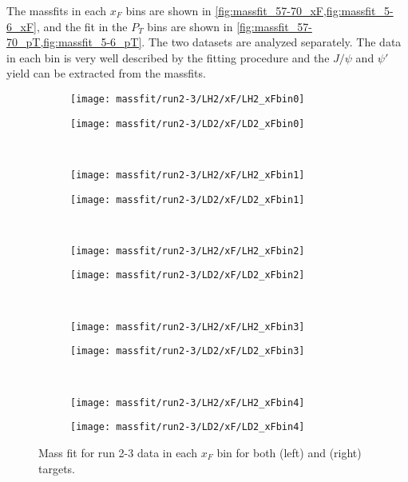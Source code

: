 \documentclass[../main.tex]{subfiles}
\begin{document}
The massfits in each $x_F$ bins are shown in \cref{fig:massfit_57-70_xF,fig:massfit_5-6_xF},
and the fit in the $P_T$ bins are shown in \cref{fig:massfit_57-70_pT,fig:massfit_5-6_pT}.
The two datasets are analyzed separately. The data in each bin is very well described by the fitting procedure
and the $J/\psi$ and $\psi'$ yield can be extracted from the massfits.
\begin{figure}[h]
	\centering
	\begin{subfigure}{0.4\linewidth}
		\texttt{[image: massfit/run2-3/LH2/xF/LH2\_xFbin0]}
	\end{subfigure}
	\begin{subfigure}{0.4\linewidth}
		\texttt{[image: massfit/run2-3/LD2/xF/LD2\_xFbin0]}
	\end{subfigure}\\
	\begin{subfigure}{0.4\linewidth}
		\texttt{[image: massfit/run2-3/LH2/xF/LH2\_xFbin1]}
	\end{subfigure}
	\begin{subfigure}{0.4\linewidth}
		\texttt{[image: massfit/run2-3/LD2/xF/LD2\_xFbin1]}
	\end{subfigure}\\
	\begin{subfigure}{0.4\linewidth}
		\texttt{[image: massfit/run2-3/LH2/xF/LH2\_xFbin2]}
	\end{subfigure}
	\begin{subfigure}{0.4\linewidth}
		\texttt{[image: massfit/run2-3/LD2/xF/LD2\_xFbin2]}
	\end{subfigure}\\
	\begin{subfigure}{0.4\linewidth}
		\texttt{[image: massfit/run2-3/LH2/xF/LH2\_xFbin3]}
	\end{subfigure}
	\begin{subfigure}{0.4\linewidth}
		\texttt{[image: massfit/run2-3/LD2/xF/LD2\_xFbin3]}
	\end{subfigure}\\
	\begin{subfigure}{0.4\linewidth}
		\texttt{[image: massfit/run2-3/LH2/xF/LH2\_xFbin4]}
	\end{subfigure}
	\begin{subfigure}{0.4\linewidth}
		\texttt{[image: massfit/run2-3/LD2/xF/LD2\_xFbin4]}
	\end{subfigure}
	\caption{Mass fit for run 2-3 data in each $x_F$ bin for both (left) and (right) targets. }
	\label{fig:massfit_57-70_xF}
\end{figure}
\end{document}
